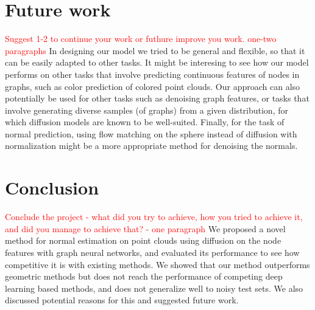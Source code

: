 \documentclass{acmart}
\newcommand{\instructions}[1]{\textcolor{red}{#1}\newline}
\begin{document}
\section{Future work}
\instructions{Suggest 1-2 to continue your work or futhure improve you work.
one-two paragraphs}
In designing our model we tried to be general and flexible, so that it can be easily adapted to other tasks. It might be interesing to see how our model performs on other tasks that involve predicting continuous features of nodes in graphs, such as color prediction of colored point clouds. Our approach can also potentially be used for other tasks such as denoising graph features, or tasks that involve generating diverse samples (of graphs) from a given distribution, for which diffusion models are known to be well-suited.
Finally, for the task of normal prediction, using flow matching \cite{lipman2023flowmatchinggenerativemodeling} on the sphere instead of diffusion with normalization might be a more appropriate method for denoising the normals.

\section{Conclusion}
\instructions{Conclude the project - what did you try to achieve, how you tried to achieve it, and did you manage to achieve that?  - one paragraph}
We proposed a novel method for normal estimation on point clouds using diffusion on the node features with graph neural networks, and evaluated its performance to see how competitive it is with existing methods. We showed that our method outperforms geometric methods but does not reach the performance of competing deep learning based methods, and does not generalize well to noisy test sets. We also discussed potential reasons for this and suggested future work.



\end{document}
